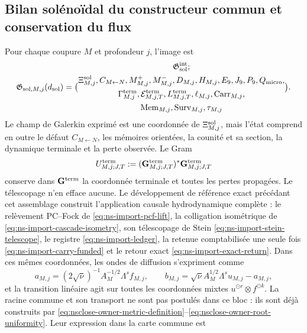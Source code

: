 \subsection{Bilan solénoïdal du constructeur commun et conservation du flux}

Pour chaque coupure $M$ et profondeur $j$, l’image est
\begin{equation}\label{eq:pdf2-g-sol-explicito}
 \mathfrak G_{{\rm sol},M,j}(d_{\rm sol})=
 \bigl(
 \begin{gathered}
  \mathfrak G_{\rm sol}^{\rm int};\\
  \Xi_{M,j}^{\rm sol},C_{M\leftarrow N},M_{M,j}^+,M_{M,j}^-,
  D_{M,j},H_{M,j},E_9,J_9,P_9,Q_{\rm micro},\\
  \Gamma_{M,j}^{\rm term},\mathcal E_{M,j,T}^{\rm term},
  L_{M,j,T}^{\rm term},\ell_{M,j},\operatorname{Carr}_{M,j},\\
  \operatorname{Mem}_{M,j},\operatorname{Surv}_{M,j},\tau_{M,j}
 \end{gathered}
 \bigr).
\end{equation}
Le champ de Galerkin exprimé est une coordonnée de $\Xi_{M,j}^{\rm sol}$, mais l’état comprend en outre le défaut $C_{M\leftarrow N}$, les mémoires orientées, la counité et sa section, la dynamique terminale et la perte observée. Le Gram
\begin{equation}\label{eq:pdf2-g-sol-gram-estructural}
 U_{M,j;J,T}^{\rm term}
 :=(\mathbf G_{M,j;J,T}^{\rm term})^*
    \mathbf G_{M,j;J,T}^{\rm term}
\end{equation}
conserve dans $\mathbf G^{\rm term}$ la coordonnée terminale et toutes les pertes propagées. Le télescopage n’en efface aucune. Le développement de référence exact précédant cet assemblage construit l’application causale hydrodynamique complète : le relèvement PC--Fock de \eqref{eq:ns-import-pcf-lift}, la colligation isométrique de \eqref{eq:ns-import-cascade-isometry}, son télescopage de Stein \eqref{eq:ns-import-stein-telescope}, le registre \eqref{eq:ns-import-ledger}, la retenue comptabilisée une seule fois \eqref{eq:ns-import-carry-funded} et le retour exact \eqref{eq:ns-import-exact-return}. Dans ces mêmes coordonnées, les ondes de diffusion s’expriment comme
\begin{equation}\label{eq:pdf2-g-sol-ondas-dato}
 a_{M,j}=(2\sqrt\nu)^{-1}A_M^{-1/2}\Lambda^sf_{M,j},
 \qquad
 b_{M,j}=\sqrt\nu A_M^{1/2}\Lambda^su_{M,j}-a_{M,j},
\end{equation}
et la transition linéaire agit sur toutes les coordonnées mixtes $u^{\odot r}\otimes f^{\odot k}$. La racine commune et son transport ne sont pas postulés dans ce bloc : ils sont déjà construits par \eqref{eq:nsclose-owner-metric-definition}--\eqref{eq:nsclose-owner-root-uniformity}. Leur expression dans la carte commune est
